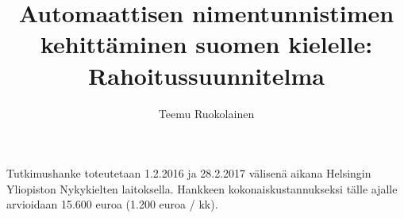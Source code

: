 \documentclass[12pt,a4paper,finnish,oneside]{article}
\begin{document}
\title{Automaattisen nimentunnistimen kehittäminen suomen kielelle: Rahoitussuunnitelma}
\author{Teemu Ruokolainen}


\maketitle

Tutkimushanke toteutetaan 1.2.2016 ja 28.2.2017 välisenä aikana Helsingin Yliopiston Nykykielten laitoksella. Hankkeen kokonaiskustannukseksi tälle ajalle arvioidaan 15.600 euroa (1.200 euroa / kk).






\end{document}
